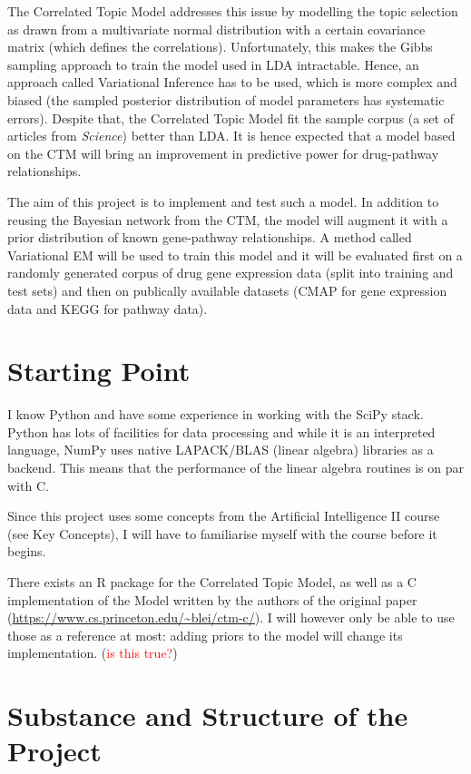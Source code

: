 \documentclass[12pt,a4]{article}
\begin{document}
The Correlated Topic Model\cite{2007} addresses this issue by modelling the topic selection as drawn from a multivariate normal distribution with a certain covariance matrix (which defines the correlations). Unfortunately, this makes the Gibbs sampling approach to train the model used in LDA intractable. Hence, an approach called Variational Inference has to be used, which is more complex and biased (the sampled posterior distribution of model parameters has systematic errors). Despite that, the Correlated Topic Model fit the sample corpus (a set of articles from {\em Science}) better than LDA. It is hence expected that a model based on the CTM will bring an improvement in predictive power for drug-pathway relationships.

The aim of this project is to implement and test such a model. In addition to reusing the Bayesian network from the CTM, the model will augment it with a prior distribution of known gene-pathway relationships. A method called Variational EM will be used to train this model and it will be evaluated first on a randomly generated corpus of drug gene expression data (split into training and test sets) and then on publically available datasets (CMAP for gene expression data and KEGG for pathway data).

\section*{Starting Point}

I know Python and have some experience in working with the SciPy stack. Python has lots of facilities for data processing and while it is an interpreted language, NumPy uses native LAPACK/BLAS (linear algebra) libraries as a backend. This means that the performance of the linear algebra routines is on par with C.

Since this project uses some concepts from the Artificial Intelligence II course (see Key Concepts), I will have to familiarise myself with the course before it begins.

There exists an R package for the Correlated Topic Model, as well as a C implementation of the Model written by the authors of the original paper (\url{https://www.cs.princeton.edu/~blei/ctm-c/}). I will however only be able to use those as a reference at most: adding priors to the model will change its implementation. (\textcolor{red}{is this true?})

\section*{Substance and Structure of the Project}
\end{document}
